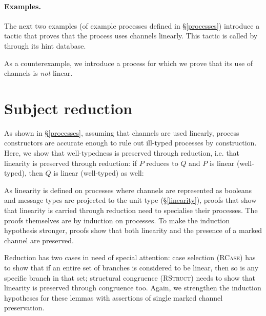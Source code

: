 \documentclass{mproj}
\begin{document}
\paragraph{Examples.}

The next two examples (of example processes defined in \S \ref{processes}) introduce a tactic that proves that the process uses channels linearly. This tactic is called by  through its hint database.


As a counterexample, we introduce a process for which we prove that its use of channels is \emph{not} linear.


\section{Subject reduction}\label{subject-reduction}

As shown in \S \ref{processes}, assuming that channels are used linearly, process constructors are accurate enough to rule out ill-typed processes by construction. Here, we show that well-typedness is preserved through reduction, i.e. that linearity is preserved through reduction: if $P$ reduces to $Q$ and $P$ is linear (well-typed), then $Q$ is linear (well-typed) as well:



As linearity is defined on processes where channels are represented as booleans and message types are projected to the unit type (\S \ref{linearity}), proofs that show that linearity is carried through reduction need to specialise their processes. The proofs themselves are by induction on processes. To make the induction hypothesis stronger, proofs show that both linearity and the presence of a marked channel are preserved.


Reduction has two cases in need of special attention: case selection (\textsc{RCase}) has to show that if an entire set of branches is considered to be linear, then so is any specific branch in that set; structural congruence (\textsc{RStruct}) needs to show that linearity is preserved through congruence too. Again, we strengthen the induction hypotheses for these lemmas with assertions of single marked channel preservation.
\end{document}
